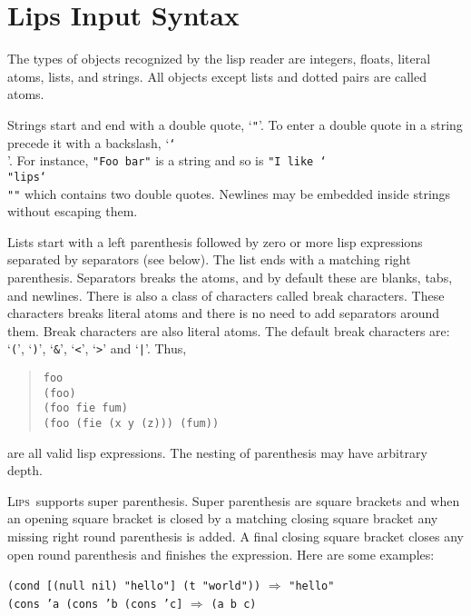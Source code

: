 \documentclass[a4paper]{article}
\newcommand{\lips}{\textsc{Lips}}
\newcommand{\lisp}[1]{\texttt{#1}}
\newenvironment{examples}{
  \newcommand{\ex}[2]{
    \lisp{##1} $\Rightarrow$ \lisp{##2}\\
  }
  \begin{adjustwidth}{0.5cm}{}}{\end{adjustwidth}}
\begin{document}
\section{Lips Input Syntax}

The types of objects recognized by the lisp reader are integers,
floats, literal atoms, lists, and strings.  All objects except lists
and dotted pairs are called atoms.

Strings start and end with a double quote, `\lisp{"}'.  To enter a
double quote in a string precede it with a backslash, `\lisp{\char`\\}'.
For instance, \lisp{"Foo bar"} is a string and so is \lisp{"I like
  \char`\\"lips\char`\\""} which contains two double quotes.  Newlines
may be embedded inside strings without escaping them.

Lists start with a left parenthesis followed by zero or more lisp
expressions separated by separators (see below).  The list ends with a
matching right parenthesis.  Separators breaks the atoms, and by
default these are blanks, tabs, and newlines.  There is also a class
of characters called break characters.  These characters breaks
literal atoms and there is no need to add separators around them.
Break characters are also literal atoms.  The default break characters
are: `\lisp{(}', `\lisp{)}', `\lisp{\&}', `\lisp{<}', `\lisp{>}' and
`\lisp{|}'.  Thus,

\begin{quote}
  \lisp{foo\\
    (foo)\\
    (foo fie fum)\\
    (foo (fie (x y (z))) (fum))}
\end{quote}

are all valid lisp expressions.  The nesting of parenthesis may have
arbitrary depth.

\lips\ supports super parenthesis. Super parenthesis are square
brackets and when an opening square bracket is closed by a matching
closing square bracket any missing right round parenthesis is added. A
final closing square bracket closes any open round parenthesis and
finishes the expression. Here are some examples:

\begin{examples}
  \ex{(cond [(null nil) "hello"] (t "world"))}{"hello"}
  \ex{(cons 'a (cons 'b (cons 'c]}{(a b c)}
\end{examples}
\end{document}
